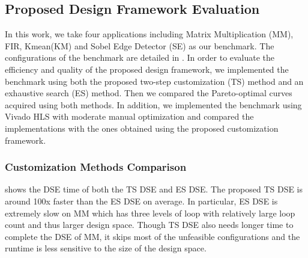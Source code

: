 \subsection{Proposed Design Framework Evaluation}
In this work, we take four applications including Matrix Multiplication (MM), 
FIR, Kmean(KM) and Sobel Edge Detector (SE) as our benchmark. The 
configurations of the benchmark are detailed in . 
In order to evaluate the efficiency and quality of the proposed design 
framework, we implemented the benchmark using both the proposed 
two-step customization (TS) method and an exhaustive search (ES) 
method. Then we compared the Pareto-optimal curves acquired 
using both methods. In addition, we implemented the benchmark 
using Vivado HLS with moderate manual optimization and compared 
the implementations with the ones obtained using the proposed 
customization framework. 
\begin{table}
\end{table}


\subsubsection{Customization Methods Comparison}
 shows the DSE time of both the TS DSE and ES DSE. 
The proposed TS DSE is around 100x faster than the ES DSE on 
average. In particular, ES DSE is extremely slow on MM 
which has three levels of loop with relatively large 
loop count and thus larger design space. Though TS DSE also needs 
longer time to complete the DSE of MM, it skips most 
of the unfeasible configurations and the runtime is 
less sensitive to the size of the design space. 

